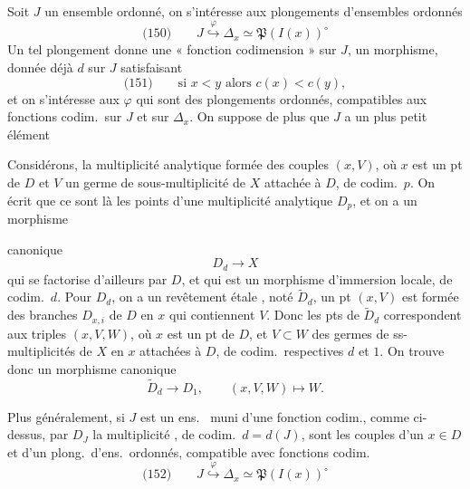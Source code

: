 \documentclass[11pt,a4paper]{article}
\begin{document}
Soit $J$ un ensemble ordonné, on s'intéresse aux plongements d'ensembles ordonnés
\[
  \text{(150)}\qquad J \overset{\varphi}{\hookrightarrow} \Delta_x \simeq \mathfrak{P}(I(x))^{\circ}
\]
Un tel plongement donne une « fonction codimension » sur $J$, un morphisme,
  
 donnée déjà $d$  sur $J$ 
satisfaisant
\[
  \text{(151)}\qquad \text{si } x < y \text{ alors } c(x) < c(y),
\]
et on s'intéresse aux $\varphi$ qui sont des plongements ordonnés, compatibles aux
fonctions codim.\ sur $J$ et sur $\Delta_x$. On suppose de plus que $J$ a un plus
petit élément 

Considérons,  la multiplicité analytique formée
des couples $(x, V)$, où $x$ est un pt de $D$ et $V$ un germe de sous-multiplicité
de $X$ attachée à $D$, de codim.\ $p$. On  écrit  que ce sont là
les points d'une multiplicité analytique  $D_p$, et on a un morphisme

canonique
\[
  D_d \longrightarrow X
\]
qui se factorise d'ailleurs par $D$, et qui est un morphisme d'immersion locale,
de codim.\ $d$. Pour $D_d$, on a un revêtement étale \ill{} \ill{}, noté
$\widetilde{D}_d$,   un pt $(x, V)$ est
formée des \ill{} branches $D_{x,i}$ de $D$ en $x$ qui contiennent $V$. Donc les
pts de $\widetilde{D}_d$ correspondent aux triples $(x, V, W)$, où $x$ est un pt
de $D$, et $V \subset W$ des germes de ss-multiplicités de $X$ en $x$ attachées
à $D$, de codim.\ respectives $d$ et $1$. On trouve donc un morphisme canonique
\[
  \widetilde{D}_d \longrightarrow D_1, \qquad (x, V, W) \longmapsto W .
\]

Plus généralement, si $J$ est un ens.\  muni d'une fonction codim.,
comme ci-dessus,  par $D_J$ la multiplicité 
 , de codim.\ $d = d(J)$,  sont les couples
d'un $x \in D$  et d'un plong.\ d'ens.\ ordonnés,
compatible avec fonctions codim.
\[
  \text{(152)}\qquad J \overset{\varphi}{\hookrightarrow} \Delta_x \simeq \mathfrak{P}(I(x))^{\circ}
\]
\end{document}
